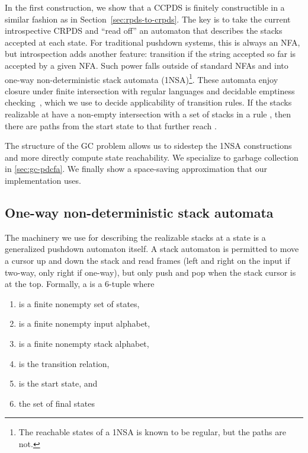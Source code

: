 In the first construction, we show that a CCPDS is finitely constructible in a similar fashion as in Section~\ref{sec:rpds-to-crpds}.
The key is to take the current introspective CRPDS and ``read off'' an automaton that describes the stacks accepted at each state.
For traditional pushdown systems, this is always an NFA, but introspection adds another feature: transition if the string accepted so far is accepted by a given NFA.
Such power falls outside of standard NFAs and into one-way non-deterministic stack automata (1NSA)\footnote{The reachable states of a 1NSA is known to be regular, but the paths are not.}.
These automata enjoy closure under finite intersection with regular languages and decidable emptiness checking~\citep{ianjohnson:one-way-sa:ginsburg:1967}, which we use to decide applicability of transition rules.
If the stacks realizable at  have a non-empty intersection with a set of stacks  in a rule , then there are paths from the start state to  that further reach .

The structure of the GC problem allows us to sidestep the 1NSA constructions and more directly compute state reachability.
We specialize to garbage collection in \autoref{sec:gc-pdcfa}.
We finally show a space-saving approximation that our implementation uses.


\subsection{One-way non-deterministic stack automata}

The machinery we use for describing the realizable stacks at a state is a generalized pushdown automaton itself.
A stack automaton is permitted to move a cursor up and down the stack and read frames (left and right on the input if two-way, only right if one-way), but only push and pop when the stack cursor is at the top.
Formally, a  is a 6-tuple  where
\begin{enumerate}
\item  is a finite nonempty set of states,
\item  is a finite nonempty input alphabet,
\item  is a finite nonempty stack alphabet,
\item  is the transition relation,
\item  is the start state, and
\item  the set of final states
\end{enumerate}

